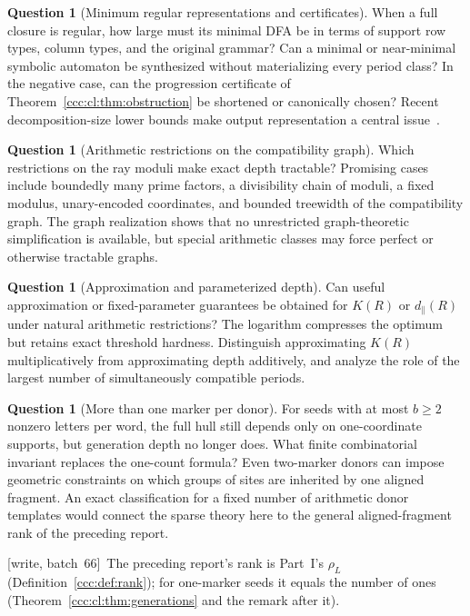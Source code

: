 \documentclass[11pt,letterpaper]{article}
\theoremstyle{definition}
\newtheorem{question}[theorem]{Question}
\theoremstyle{remark}
\newcommand{\rank}{\rho}
\newcommand{\wsix}{\textup{[write, batch~66]}}
\begin{document}
\begin{question}[Minimum regular representations and certificates]\label{ccc:cl:q:minimal}
When a full closure is regular, how large must its minimal DFA be in
terms of support row types, column types, and the original grammar?
Can a minimal or near-minimal symbolic automaton be synthesized without
materializing every period class? In the negative case, can the
progression certificate of Theorem~\ref{ccc:cl:thm:obstruction} be shortened
or canonically chosen? Recent decomposition-size lower bounds make
output representation a central issue~\cite{Ganardi}.
\end{question}

\begin{question}[Arithmetic restrictions on the compatibility graph]\label{ccc:cl:q:arithmetic}
Which restrictions on the ray moduli make exact depth tractable?
Promising cases include boundedly many prime factors, a divisibility
chain of moduli, a fixed modulus, unary-encoded coordinates, and
bounded treewidth of the compatibility graph. The graph realization
shows that no unrestricted graph-theoretic simplification is available,
but special arithmetic classes may force perfect or otherwise
tractable graphs.
\end{question}

\begin{question}[Approximation and parameterized depth]\label{ccc:cl:q:approx}
Can useful approximation or fixed-parameter guarantees be obtained for
$K(R)$ or $d_{\parallel}(R)$ under natural arithmetic restrictions?
The logarithm compresses the optimum but retains exact threshold
hardness. Distinguish approximating $K(R)$ multiplicatively from
approximating depth additively, and analyze the role of the largest
number of simultaneously compatible periods.
\end{question}

\begin{question}[More than one marker per donor]\label{ccc:cl:q:markers}
For seeds with at most $b\ge2$ nonzero letters per word, the full hull
still depends only on one-coordinate supports, but generation depth
no longer does. What finite combinatorial invariant replaces the
one-count formula? Even two-marker donors can impose geometric
constraints on which groups of sites are inherited by one aligned
fragment. An exact classification for a fixed number of arithmetic
donor templates would connect the sparse theory here to the general
aligned-fragment rank of the preceding report.
\end{question}
\wsix\ The preceding report's rank is Part~I's $\rank_L$
(Definition~\ref{ccc:def:rank}); for one-marker seeds it equals the number
of ones (Theorem~\ref{ccc:cl:thm:generations} and the remark after it).
\end{document}
